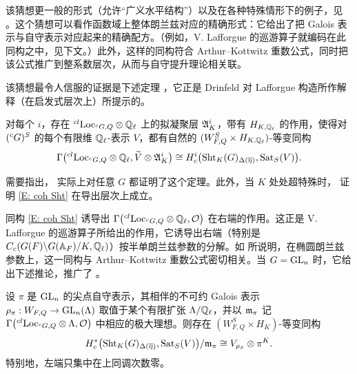 该猜想更一般的形式（允许“广义水平结构”）以及在各种特殊情形下的例子，见 \cite[Sect. 4.7]{Zhu-Conjecture}。这个猜想可以看作函数域上整体朗兰兹对应的精确形式：它给出了把 Galois 表示与自守表示对应起来的精确配方。（例如，V. Lafforgue 的巡游算子就编码在此同构之中，见下文。）此外，这样的同构符合 Arthur--Kottwitz 重数公式，同时把该公式推广到整系数层次，从而与自守提升理论相关联。

该猜想最令人信服的证据是下述定理 \cite{Lafforgue-Zhu-Elliptic, Zhu-Conjecture}，它正是 Drinfeld 对 Lafforgue 构造所作解释（在启发式层次上）所提示的。

\begin{thm}\label{T: gen LZ}
对每个 $i$，存在 ${}^{cl}{\operatorname{Loc}}_{{}^cG,Q}\otimes{\mathbb Q}_\ell$ 上的拟凝聚层 ${\mathfrak A}^i_K$，带有 $H_{K,{\mathbb Q}_\ell}$ 的作用，使得对 $({}^cG)^S$ 的每个有限维 ${\mathbb Q}_\ell$-表示 $V$，都有自然的 $(W_{F,Q}^S\times H_{K,{\mathbb Q}_\ell})$-等变同构
\begin{equation*}\label{E: coh Sht}
\Gamma\big({}^{cl}{\operatorname{Loc}}_{{}^cG,Q}\otimes{\mathbb Q}_\ell,\widetilde V\otimes {\mathfrak A}^i_K\big)\cong H^i_c\bigl({\operatorname{Sht}}_K(G)_{\Delta(\overline\eta)},{\operatorname{Sat}}_S(V)\bigr).
\end{equation*}
\end{thm}

需要指出，\cite{Lafforgue-Zhu-Elliptic, Zhu-Conjecture} 实际上对任意 $G$ 都证明了这个定理。此外，当 $K$ 处处超特殊时，\cite{AGKRRV} 证明 \eqref{E: coh Sht} 在导出层次上成立。

同构 \eqref{E: coh Sht} 诱导出 $\Gamma\big({}^{cl}{\operatorname{Loc}}_{{}^cG,Q}\otimes{\mathbb Q}_\ell,{\mathcal O}\big)$ 在右端的作用。这正是 V. Lafforgue 的巡游算子所给出的作用，它诱导出右端（特别是 $C_c(G(F)\backslash G({\mathbb A}_F)/K, {\mathbb Q}_\ell)$）按半单朗兰兹参数的分解。如 \cite{Lafforgue-Zhu-Elliptic} 所说明，在椭圆朗兰兹参数上，这一同构与 Arthur--Kottwitz 重数公式密切相关。当 $G={\operatorname{GL}}_n$ 时，它给出下述推论，推广了 \cite{Lafforgue-GLn}。

\begin{cor}
设 $\pi$ 是 ${\operatorname{GL}}_n$ 的尖点自守表示，其相伴的不可约 Galois 表示 $\rho_\pi: W_{F,Q}\to {\operatorname{GL}}_n({\Lambda})$ 取值于某个有限扩张 ${\Lambda}/{\mathbb Q}_\ell$，并以 ${\mathfrak m}_\pi$ 记 $\Gamma\big({}^{cl}{\operatorname{Loc}}_{{}^cG,Q}\otimes{\Lambda},{\mathcal O}\big)$ 中相应的极大理想。则存在 $(W_{F,Q}^S\times H_K)$-等变同构
\[
H^*_c\big({\operatorname{Sht}}_K(G)_{\Delta(\overline\eta)}, {\operatorname{Sat}}_S(V)\big)/{\mathfrak m}_\pi\cong  V_{\rho_\pi}\otimes \pi^K.
\]
特别地，左端只集中在上同调次数零。
\end{cor}
